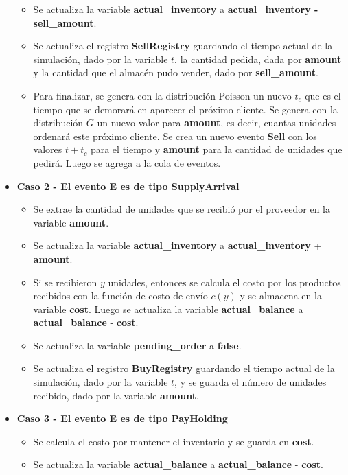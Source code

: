 \documentclass{article}
\begin{document}
\begin{itemize}
\begin{itemize}
        \item Se actualiza la variable \textbf{actual\_inventory} a \textbf{actual\_inventory - sell\_amount}.
        \item Se actualiza el registro \textbf{SellRegistry} guardando el tiempo actual de la simulación, dado por la variable $t$, la cantidad pedida, dada por \textbf{amount} y la cantidad que el almacén pudo vender, dado por \textbf{sell\_amount}.
        \item Para finalizar, se genera con la distribución Poisson un nuevo $t_c$ que es el tiempo que se demorará en aparecer el próximo cliente. Se genera con la distribución $G$ un nuevo valor para \textbf{amount}, es decir, cuantas unidades ordenará este próximo cliente. Se crea un nuevo evento \textbf{Sell} con los valores $t + t_c$ para el tiempo y \textbf{amount} para la cantidad de unidades que pedirá. Luego se agrega a la cola de eventos.
    \end{itemize}
    \item \textbf{Caso 2 - El evento E es de tipo SupplyArrival}
    \begin{itemize}
        \item Se extrae la cantidad de unidades que se recibió por el proveedor en la variable \textbf{amount}.
        \item Se actualiza la variable \textbf{actual\_inventory} a \textbf{actual\_inventory} + \textbf{amount}.
        \item Si se recibieron $y$ unidades, entonces se calcula el costo por los productos recibidos con la función de costo de envío $c(y)$ y se almacena en la variable \textbf{cost}. Luego se actualiza la variable \textbf{actual\_balance} a \textbf{actual\_balance} - \textbf{cost}.
        \item Se actualiza la variable \textbf{pending\_order} a \textbf{false}.
        \item Se actualiza el registro \textbf{BuyRegistry} guardando el tiempo actual de la simulación, dado por la variable $t$, y se guarda el número de unidades recibido, dado por la variable \textbf{amount}.
    \end{itemize}
    \item \textbf{Caso 3 - El evento E es de tipo PayHolding}
    \begin{itemize}
        \item Se calcula el costo por mantener el inventario y se guarda en \textbf{cost}.
        \item Se actualiza la variable \textbf{actual\_balance} a \textbf{actual\_balance} - \textbf{cost}.

\end{itemize}
\end{itemize}
\end{document}
